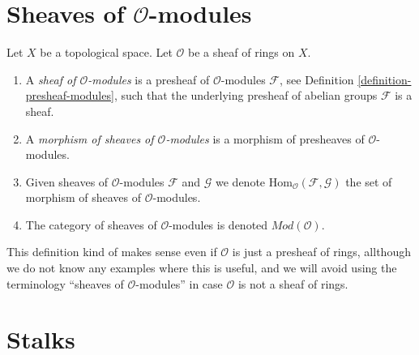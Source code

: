 \section{Sheaves of $\mathcal{O}$-modules}
\label{section-sheaves-modules}

\begin{definition}
\label{definition-sheaf-modules}
Let $X$ be a topological space.
Let $\mathcal{O}$ be a sheaf of rings on $X$.
\begin{enumerate}
\item A {\it sheaf of $\mathcal{O}$-modules} is a presheaf
of $\mathcal{O}$-modules $\mathcal{F}$,
see Definition \ref{definition-presheaf-modules},
such that the underlying presheaf of abelian groups $\mathcal{F}$
is a sheaf.
\item A {\it morphism of sheaves of $\mathcal{O}$-modules}
is a morphism of presheaves of $\mathcal{O}$-modules.
\item Given sheaves of $\mathcal{O}$-modules
$\mathcal{F}$ and $\mathcal{G}$ we denote
$\text{Hom}_{\mathcal{O}}(\mathcal{F}, \mathcal{G})$
the set of morphism of sheaves of $\mathcal{O}$-modules.
\item The category of sheaves of $\mathcal{O}$-modules
is denoted $\textit{Mod}(\mathcal{O})$.
\end{enumerate}
\end{definition}

\noindent
This definition kind of makes sense even if $\mathcal{O}$ is just a
presheaf of rings, allthough we do not know any examples where
this is useful, and we will avoid using the terminology
``sheaves of $\mathcal{O}$-modules''
in case $\mathcal{O}$ is not a sheaf of rings.







\section{Stalks}
\label{section-stalks}

